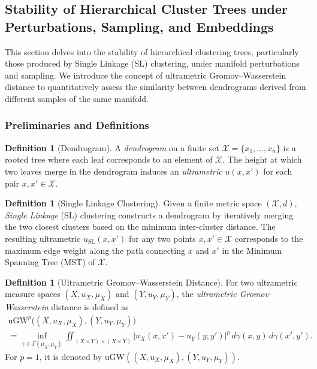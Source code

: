 \documentclass{article}
\theoremstyle{plain}
\theoremstyle{definition}
\newtheorem{definition}[theorem]{Definition}
\theoremstyle{remark}
\begin{document}
\subsection{Stability of Hierarchical Cluster Trees under Perturbations, Sampling, and Embeddings}
\label{app:ultrametric-details}

This section delves into the stability of hierarchical clustering trees, particularly those produced by Single Linkage (SL) clustering, under manifold perturbations and sampling. We introduce the concept of ultrametric Gromov--Wasserstein distance to quantitatively assess the similarity between dendrograms derived from different samples of the same manifold.

\subsubsection{Preliminaries and Definitions}

\begin{definition}[Dendrogram]
A \emph{dendrogram} on a finite set $\mathcal{X} = \{x_1, \dots, x_n\}$ is a rooted tree where each leaf corresponds to an element of $\mathcal{X}$. The height at which two leaves merge in the dendrogram induces an \emph{ultrametric} $u(x, x')$ for each pair $x, x' \in \mathcal{X}$.
\end{definition}

\begin{definition}[Single Linkage Clustering]
Given a finite metric space $(\mathcal{X}, d)$, \emph{Single Linkage} (SL) clustering constructs a dendrogram by iteratively merging the two closest clusters based on the minimum inter-cluster distance. The resulting ultrametric $u_{\mathrm{SL}}(x, x')$ for any two points $x, x' \in \mathcal{X}$ corresponds to the maximum edge weight along the path connecting $x$ and $x'$ in the Minimum Spanning Tree (MST) of $\mathcal{X}$.
\end{definition}

\begin{definition}[Ultrametric Gromov--Wasserstein Distance]
For two ultrametric measure spaces $(X, u_X, \mu_X)$ and $(Y, u_Y, \mu_Y)$, the \emph{ultrametric Gromov--Wasserstein} distance is defined as
\begin{multline*}
    \mathrm{uGW}^p\big((X, u_X, \mu_X), (Y, u_Y, \mu_Y)\big) \\= \inf_{\gamma \in \Gamma(\mu_X, \mu_Y)} \iint_{(X \times Y) \times (X \times Y)} |u_X(x, x') - u_Y(y, y')|^p \, d\gamma(x, y) \, d\gamma(x', y').
\end{multline*}
For $p=1$, it is denoted by $\mathrm{uGW}((X, u_X, \mu_X), (Y, u_Y, \mu_Y))$.
\end{definition}
\end{document}
